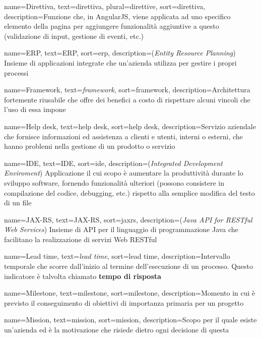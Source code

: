 {
    name={Direttiva},
    text=direttiva,
    plural=direttive,
    sort=direttiva,
    description={Funzione che, in AngularJS, viene applicata ad uno specifico elemento della pagina per aggiungere funzionalità aggiuntive a questo (validazione di input, gestione di eventi, etc.)}
}

{
    name={ERP},
    text=ERP,
    sort=erp,
    description={(\emph{Entity Resource Planning}) Insieme di applicazioni integrate che un'azienda utilizza per gestire i propri processi}
}

{
    name={Framework},
    text=\emph{framework},
    sort=framework,
    description={Architettura fortemente riusabile che offre dei benefici a costo di rispettare alcuni vincoli che l'uso di essa impone}
}

{
    name={Help desk},
    text=help desk,
    sort=help desk,
    description={Servizio aziendale che fornisce informazioni ed assistenza a clienti e utenti, interni o esterni, che hanno problemi nella gestione di un prodotto o servizio}
}

{
    name={IDE},
    text=IDE,
    sort=ide,
    description={(\emph{Integrated Development Enviroment}) Applicazione il cui scopo è aumentare la produttività durante lo sviluppo software, fornendo funzionalità ulteriori (possono consistere in compilazione del codice, debugging, etc.) rispetto alla semplice modifica del testo di un file}
}

{
    name={JAX-RS},
    text=JAX-RS,
    sort=jaxrs,
    description={(\emph{Java API for RESTful Web Services}) Insieme di API per il linguaggio di programmazione Java che facilitano la realizzazione di servizi Web RESTful}
}

{
    name={Lead time},
    text=\emph{lead time},
    sort=lead time,
    description={Intervallo temporale che scorre dall'inizio al termine dell'esecuzione di un processo. Questo indicatore è talvolta chiamato \textbf{tempo di risposta}}
}

{
    name={Milestone},
    text=milestone,
    sort=milestone,
    description={Momento in cui è previsto il conseguimento di obiettivi di importanza primaria per un progetto}
}

{
    name={Mission},
    text=mission,
    sort=mission,
    description={Scopo per il quale esiste un'azienda ed è la motivazione che risiede dietro ogni decisione di questa}
}

